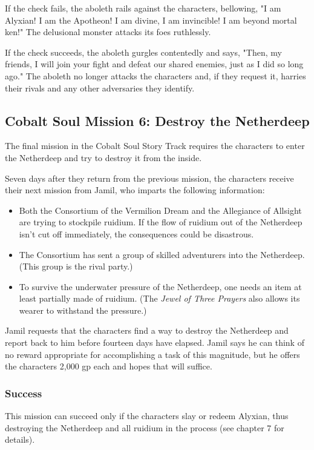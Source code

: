 \documentclass[10pt,a4paper,twoside,bg=print,twocolumn,openany,nodeprecatedcode]{dndbook}
\begin{document}
If the check fails, the aboleth rails against the characters, bellowing, "I am Alyxian! I am the Apotheon! I am divine, I am invincible! I am beyond mortal ken!" The delusional monster attacks its foes ruthlessly.

If the check succeeds, the aboleth gurgles contentedly and says, "Then, my friends, I will join your fight and defeat our shared enemies, just as I did so long ago." The aboleth no longer attacks the characters and, if they request it, harries their rivals and any other adversaries they identify.

\subsection{Cobalt Soul Mission 6: Destroy the Netherdeep}
The final mission in the Cobalt Soul Story Track requires the characters to enter the Netherdeep and try to destroy it from the inside.

Seven days after they return from the previous mission, the characters receive their next mission from Jamil, who imparts the following information:


\begin{itemize}
\item Both the Consortium of the Vermilion Dream and the Allegiance of Allsight are trying to stockpile ruidium. If the flow of ruidium out of the Netherdeep isn't cut off immediately, the consequences could be disastrous.
\item The Consortium has sent a group of skilled adventurers into the Netherdeep. (This group is the rival party.)
\item To survive the underwater pressure of the Netherdeep, one needs an item at least partially made of ruidium. (The \textit{Jewel of Three Prayers} also allows its wearer to withstand the pressure.)
\end{itemize}

Jamil requests that the characters find a way to destroy the Netherdeep and report back to him before fourteen days have elapsed. Jamil says he can think of no reward appropriate for accomplishing a task of this magnitude, but he offers the characters 2,000 gp each and hopes that will suffice.

\subsubsection{Success}
This mission can succeed only if the characters slay or redeem Alyxian, thus destroying the Netherdeep and all ruidium in the process (see chapter 7 for details).
\end{document}
